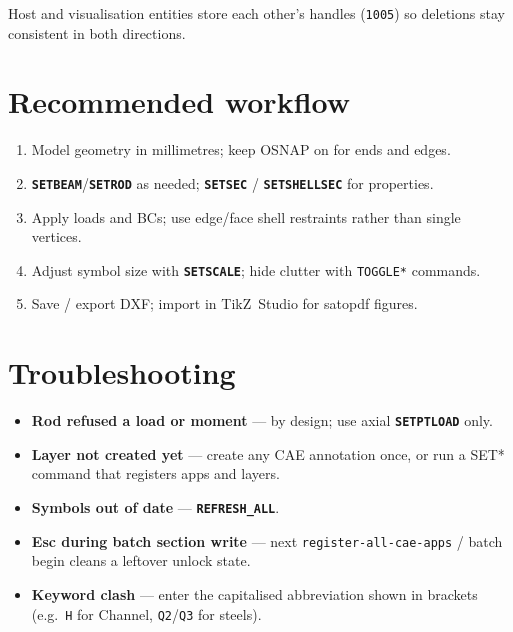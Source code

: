 \documentclass[a4paper]{ltxdoc}
\newcommand{\cadcmd}[1]{\texttt{\textbf{#1}}}
\begin{document}
Host and visualisation entities store each other's handles (\texttt{1005})
so deletions stay consistent in both directions.

\section{Recommended workflow}

\begin{enumerate}[nosep]
  \item Model geometry in millimetres; keep OSNAP on for ends and edges.
  \item \cadcmd{SETBEAM}/\cadcmd{SETROD} as needed; \cadcmd{SETSEC} /
        \cadcmd{SETSHELLSEC} for properties.
  \item Apply loads and BCs; use edge/face shell restraints rather than
        single vertices.
  \item Adjust symbol size with \cadcmd{SETSCALE}; hide clutter with
        \texttt{TOGGLE*} commands.
  \item Save / export DXF; import in TikZ~Studio for \textsf{satopdf}
        figures.
\end{enumerate}

\section{Troubleshooting}

\begin{itemize}[nosep]
  \item \textbf{Rod refused a load or moment} --- by design; use axial
        \cadcmd{SETPTLOAD} only.
  \item \textbf{Layer not created yet} --- create any CAE annotation once,
        or run a SET* command that registers apps and layers.
  \item \textbf{Symbols out of date} --- \cadcmd{REFRESH\_ALL}.
  \item \textbf{Esc during batch section write} --- next
        \texttt{register-all-cae-apps} / batch begin cleans a leftover
        unlock state.
  \item \textbf{Keyword clash} --- enter the capitalised abbreviation
        shown in brackets (e.g.\ \texttt{H} for Channel, \texttt{Q2}/\texttt{Q3}
        for steels).
\end{itemize}
\end{document}
